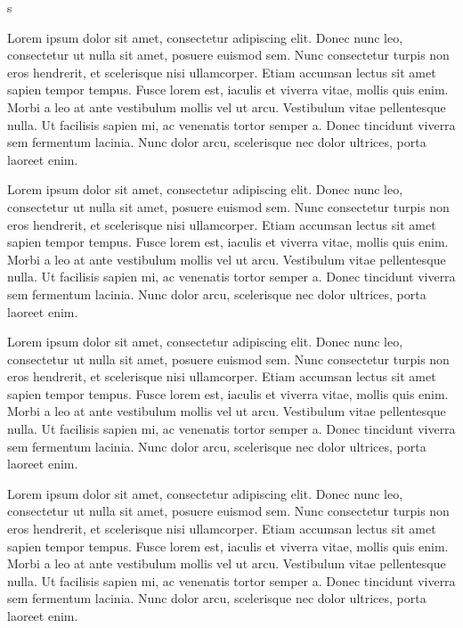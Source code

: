 \documentclass{article}
\begin{document}
s
\begin{pages}
\begin{Leftside}
\beginnumbering
\pstart

Lorem ipsum dolor sit amet, consectetur adipiscing elit. Donec nunc leo, consectetur ut nulla sit amet, posuere euismod sem. Nunc consectetur turpis non eros hendrerit, et scelerisque nisi ullamcorper. Etiam accumsan lectus sit amet sapien tempor tempus. Fusce lorem est, iaculis et viverra vitae, mollis quis enim. Morbi a leo at ante vestibulum mollis vel ut arcu. Vestibulum vitae pellentesque nulla. Ut facilisis sapien mi, ac venenatis tortor semper a. Donec tincidunt viverra sem fermentum lacinia. Nunc dolor arcu, scelerisque nec dolor ultrices, porta laoreet enim.


Lorem ipsum dolor sit amet, consectetur adipiscing elit. Donec nunc leo, consectetur ut nulla sit amet, posuere euismod sem. Nunc consectetur turpis non eros hendrerit, et scelerisque nisi ullamcorper. Etiam accumsan lectus sit amet sapien tempor tempus. Fusce lorem est, iaculis et viverra vitae, mollis quis enim. Morbi a leo at ante vestibulum mollis vel ut arcu. Vestibulum vitae pellentesque nulla. Ut facilisis sapien mi, ac venenatis tortor semper a. Donec tincidunt viverra sem fermentum lacinia. Nunc dolor arcu, scelerisque nec dolor ultrices, porta laoreet enim.
\pend
\endnumbering

\end{Leftside}
\begin{Rightside}
\beginnumbering
\pstart

Lorem ipsum dolor sit amet, consectetur adipiscing elit. Donec nunc leo, consectetur ut nulla sit amet, posuere euismod sem. Nunc consectetur turpis non eros hendrerit, et scelerisque nisi ullamcorper. Etiam accumsan lectus sit amet sapien tempor tempus. Fusce lorem est, iaculis et viverra vitae, mollis quis enim. Morbi a leo at ante vestibulum mollis vel ut arcu. Vestibulum vitae pellentesque nulla. Ut facilisis sapien mi, ac venenatis tortor semper a. Donec tincidunt viverra sem fermentum lacinia. Nunc dolor arcu, scelerisque nec dolor ultrices, porta laoreet enim.


Lorem ipsum dolor sit amet, consectetur adipiscing elit. Donec nunc leo, consectetur ut nulla sit amet, posuere euismod sem. Nunc consectetur turpis non eros hendrerit, et scelerisque nisi ullamcorper. Etiam accumsan lectus sit amet sapien tempor tempus. Fusce lorem est, iaculis et viverra vitae, mollis quis enim. Morbi a leo at ante vestibulum mollis vel ut arcu. Vestibulum vitae pellentesque nulla. Ut facilisis sapien mi, ac venenatis tortor semper a. Donec tincidunt viverra sem fermentum lacinia. Nunc dolor arcu, scelerisque nec dolor ultrices, porta laoreet enim.
\pend
\endnumbering
\end{Rightside}
\Pages
\end{pages}
\end{document}
